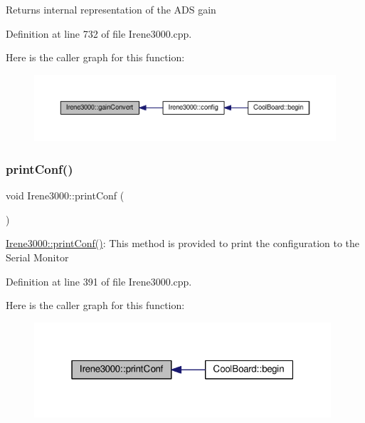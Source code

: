 \begin{DoxyReturn}{Returns}
internal representation of the A\+DS gain 
\end{DoxyReturn}


Definition at line 732 of file Irene3000.\+cpp.

Here is the caller graph for this function\+:\nopagebreak
\begin{figure}[H]
\begin{center}
\leavevmode
\includegraphics[width=350pt]{class_irene3000_abcad62d1201a59f8dd3ba87048002728_icgraph}
\end{center}
\end{figure}
\mbox{\label{class_irene3000_a7bc2414100b5e19eacc6630fa34b2654}} 
\subsubsection{\texorpdfstring{print\+Conf()}{printConf()}}
{\footnotesize\ttfamily void Irene3000\+::print\+Conf (\begin{DoxyParamCaption}{ }\end{DoxyParamCaption})}

\hyperlink{class_irene3000_a7bc2414100b5e19eacc6630fa34b2654}{Irene3000\+::print\+Conf()}\+: This method is provided to print the configuration to the Serial Monitor 

Definition at line 391 of file Irene3000.\+cpp.

Here is the caller graph for this function\+:\nopagebreak
\begin{figure}[H]
\begin{center}
\leavevmode
\includegraphics[width=313pt]{class_irene3000_a7bc2414100b5e19eacc6630fa34b2654_icgraph}
\end{center}
\end{figure}
\mbox{\label{class_irene3000_a852a170feea994ea1df01c6b245b5d9a}} 
